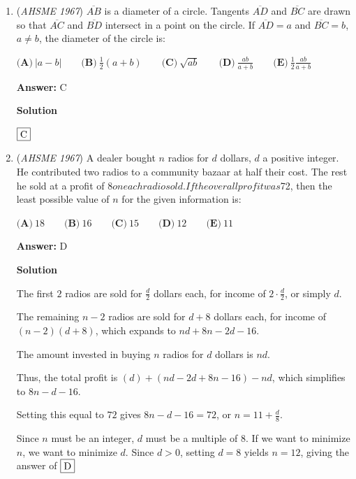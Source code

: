 \begin{enumerate}
 \textbf{Answer: }E



\textbf{Solution}

$\fbox{E}$



	\item (\textit{AHSME 1967}) $\overline{AB}$ is a diameter of a circle.  Tangents $\overline{AD}$ and $\overline{BC}$ are drawn so that $\overline{AC}$ and $\overline{BD}$ intersect in a point on the circle.  If $\overline{AD}=a$ and $\overline{BC}=b$, $a \not= b$, the diameter of the circle is:


 $\textbf{(A)}\ |a-b|\qquad \textbf{(B)}\ \frac{1}{2}(a+b)\qquad \textbf{(C)}\ \sqrt{ab} \qquad \textbf{(D)}\ \frac{ab}{a+b}\qquad \textbf{(E)}\ \frac{1}{2}\frac{ab}{a+b}$

 \textbf{Answer: }C



\textbf{Solution}

$\fbox{C}$



	\item (\textit{AHSME 1967}) A dealer bought $n$ radios for $d$ dollars, $d$ a positive integer.  He contributed two radios to a community bazaar at half their cost.  The rest he sold at a profit of $8 on each radio sold.  If the overall profit was $72, then the least possible value of $n$ for the given information is:


 $\textbf{(A)}\ 18\qquad \textbf{(B)}\ 16\qquad \textbf{(C)}\ 15\qquad \textbf{(D)}\ 12\qquad \textbf{(E)}\ 11$

 \textbf{Answer: }D



\textbf{Solution}

The first $2$ radios are sold for $\frac{d}{2}$ dollars each, for income of $2 \cdot \frac{d}{2}$, or simply $d$.

 The remaining $n-2$ radios are sold for $d+8$ dollars each, for income of $(n-2)(d+8)$, which expands to $nd +8n -2d - 16$.

 The amount invested in buying $n$ radios for $d$ dollars is $nd$.

 Thus, the total profit is $(d) + (nd - 2d + 8n - 16) - nd$, which simplifies to $8n - d - 16$.

 Setting this equal to $72$ gives $8n - d - 16 = 72$, or $n = 11 + \frac{d}{8}$.

 Since $n$ must be an integer, $d$ must be a multiple of $8$.  If we want to minimize $n$, we want to minimize $d$.  Since $d>0$, setting $d=8$ yields $n=12$, giving the answer of $\fbox{D}$




\end{enumerate}
